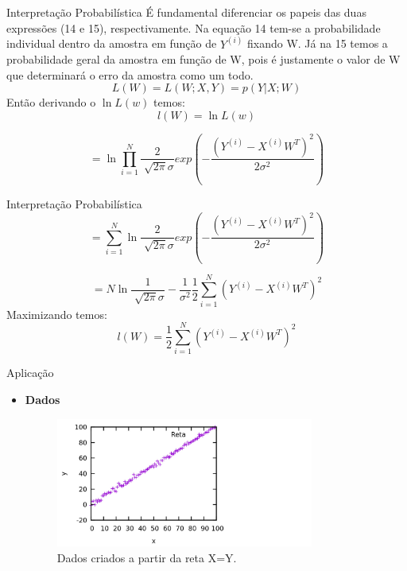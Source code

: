 \documentclass{beamer}
\begin{document}
\begin{frame}{Interpretação Probabilística}
É fundamental diferenciar os papeis das duas expressões (14 e 15), respectivamente. Na equação 14 tem-se a probabilidade individual dentro da amostra em função de $Y^{(i)}$ fixando W. Já na 15 temos a probabilidade geral da amostra em função de W, pois é justamente o valor de W que determinará o erro da amostra como um todo. 
\begin{equation}
L(W) = L(W;X,Y) = p(Y|X;W)
\end{equation}
 Então derivando o $ \ln L(w) $ temos:
 \begin{equation}
 l(W) = \ln L(w)
 \end{equation}
 
 \begin{equation}
 	=\ln \prod_{i=1} ^N \frac{2}{\sqrt[]{2 \pi} \sigma} exp \left( - \frac{(Y^{(i)} - X^{(i)}W^T)^2}{2 \sigma ^2} \right)
 \end{equation}
     \end{frame}
     
  \begin{frame}{Interpretação Probabilística}
   \begin{equation}
  = \sum_{i=1}^N \ln  \frac{2}{\sqrt[]{2 \pi} \sigma} exp{ \left( - \frac{(Y^{(i)} - X^{(i)}W^T)^2}{2 \sigma ^2} \right)}
 \end{equation} 
 
 \begin{equation} 
 =  N\ln \frac{1}{\sqrt[]{2 \pi} \sigma} - \frac{1}{\sigma ^2 }  \frac{1}{2}\sum_{i=1}^N \left(    	Y^{(i)} - X^{(i)}W^T \right)^2
    \end{equation}
  Maximizando temos:
  \begin{equation}
   l(W) = \frac{1}{2}\sum_{i=1}^N \left(Y^{(i)} - X^{(i)}W^T \right)^2
  \end{equation}
  \end{frame}
  
  \begin{frame}{Aplicação}
  \begin{itemize}
  \item \textbf{ Dados}
  \begin{figure}
  \centering
  \includegraphics[width=0.8\textwidth]{Reta.jpg}
  \caption{Dados criados a partir da reta X=Y.}
  \end{figure}
  \end{itemize}
  \end{frame}
  
\end{document}
